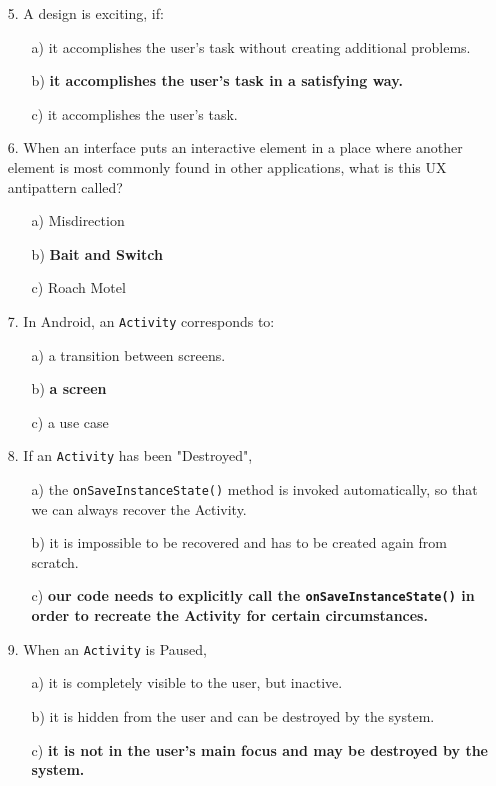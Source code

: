 \documentclass[12pt]{book}
\begin{document}
\begin{itemize}
    \item[5.] A design is exciting, if:
    \begin{itemize}
        \item[a)] it accomplishes the user's task without creating additional problems.
        \item[b)] \textbf{it accomplishes the user's task in a satisfying way.}
        \item[c)] it accomplishes the user's task.
    \end{itemize}
    
    \item[6.] When an interface puts an interactive element in a place where another element is most commonly found in other applications, what is this UX antipattern called?
    \begin{itemize}
        \item[a)] Misdirection
        \item[b)] \textbf{Bait and Switch}
        \item[c)] Roach Motel
    \end{itemize}
    
    \item[7.] In Android, an \texttt{Activity} corresponds to:
    \begin{itemize}
        \item[a)] a transition between screens.
        \item[b)] \textbf{a screen}
        \item[c)] a use case
    \end{itemize}
    
    \item[8.] If an \texttt{Activity} has been "Destroyed",
    \begin{itemize}
        \item[a)] the \texttt{onSaveInstanceState()} method is invoked automatically, so that we can always recover the Activity.
        \item[b)] it is impossible to be recovered and has to be created again from scratch.
        \item[c)] \textbf{our code needs to explicitly call the \texttt{onSaveInstanceState()} in order to recreate the Activity for certain circumstances.}
    \end{itemize}
    
    \item[9.] When an \texttt{Activity} is Paused,
    \begin{itemize}
        \item[a)] it is completely visible to the user, but inactive.
        \item[b)] it is hidden from the user and can be destroyed by the system.
        \item[c)] \textbf{it is not in the user's main focus and may be destroyed by the system.}
    \end{itemize}
    

\end{itemize}
\end{document}
